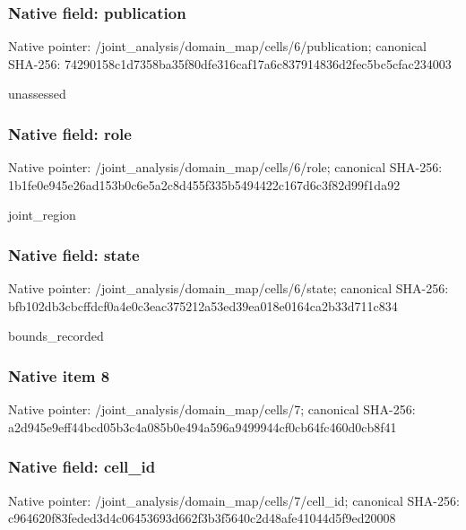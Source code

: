 \documentclass[10pt,a4paper]{article}
\begin{document}
\subsubsection{Native field: publication}
Native pointer: /joint\_\allowbreak{}analysis/domain\_\allowbreak{}map/cells/6/publication; canonical SHA-256: 74290158c1d7358ba35f80dfe316caf17a6c837914836d2fec5bc5cfac234003

\begingroup\raggedright\sloppy unassessed\par\endgroup

\subsubsection{Native field: role}
Native pointer: /joint\_\allowbreak{}analysis/domain\_\allowbreak{}map/cells/6/role; canonical SHA-256: 1b1fe0e945e26ad153b0c6e5a2c8d455f335b5494422c167d6c3f82d99f1da92

\begingroup\raggedright\sloppy joint\_\allowbreak{}region\par\endgroup

\subsubsection{Native field: state}
Native pointer: /joint\_\allowbreak{}analysis/domain\_\allowbreak{}map/cells/6/state; canonical SHA-256: bfb102db3cbcffdcf0a4e0c3eac375212a53ed39ea018e0164ca2b33d711c834

\begingroup\raggedright\sloppy bounds\_\allowbreak{}recorded\par\endgroup

\subsubsection{Native item 8}
Native pointer: /joint\_\allowbreak{}analysis/domain\_\allowbreak{}map/cells/7; canonical SHA-256: a2d945e9eff44bcd05b3c4a085b0e494a596a9499944cf0cb64fc460d0cb8f41

\subsubsection{Native field: cell\_\allowbreak{}id}
Native pointer: /joint\_\allowbreak{}analysis/domain\_\allowbreak{}map/cells/7/cell\_\allowbreak{}id; canonical SHA-256: c964620f83feded3d4c06453693d662f3b3f5640c2d48afe41044d5f9ed20008
\end{document}
